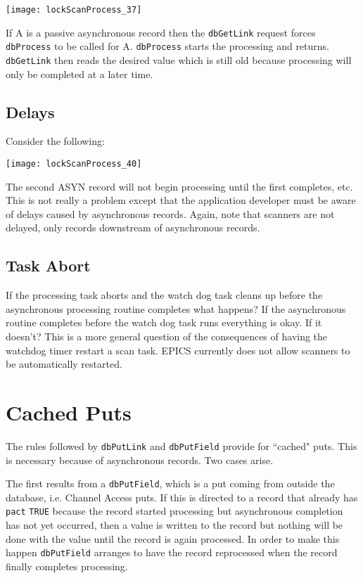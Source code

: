 \begin{center}
\texttt{[image: lockScanProcess\_37]}
\end{center}

If A is a passive asynchronous record then the \verb|dbGetLink| request forces \verb|dbProcess| to be called for A. \verb|dbProcess| 
starts the processing and returns. \verb|dbGetLink| then reads the desired value which is still old because processing will only 
be completed at a later time.

\subsection{Delays}

Consider the following:

\begin{center}
\texttt{[image: lockScanProcess\_40]}
\end{center}

The second ASYN record will not begin processing until the first completes, etc. This is not really a problem except that 
the application developer must be aware of delays caused by asynchronous records. Again, note that scanners are not 
delayed, only records downstream of asynchronous records. 

\subsection{Task Abort}

If the processing task aborts and the watch dog task cleans up before the asynchronous processing routine completes what 
happens? If the asynchronous routine completes before the watch dog task runs everything is okay. If it doesn't? This is a 
more general question of the consequences of having the watchdog timer restart a scan task. EPICS currently does not 
allow scanners to be automatically restarted. 

\section{Cached Puts}

The rules followed by \verb|dbPutLink| and \verb|dbPutField| provide for ``cached" puts. This is necessary because of 
asynchronous records. Two cases arise.

The first results from a \verb|dbPutField|, which is a put coming from outside the database, i.e. Channel Access puts. If this 
is directed to a record that already has \verb|pact| \verb|TRUE| because the record started processing but asynchronous completion 
has not yet occurred, then a value is written to the record but nothing will be done with the value until the record is again 
processed. In order to make this happen \verb|dbPutField| arranges to have the record reprocessed when the record finally 
completes processing.


